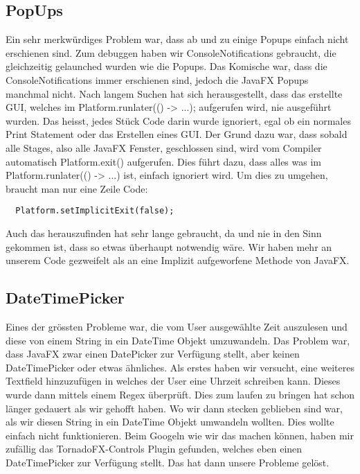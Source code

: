 \documentclass[11pt,titelpage]{scrartcl}
\begin{document}
\subsection{PopUps}
Ein sehr merkwürdiges Problem war, dass ab und zu einige Popups einfach nicht erschienen sind. Zum debuggen haben wir ConsoleNotifications gebraucht, die gleichzeitig gelaunched wurden wie die Popups. Das Komische war, dass die ConsoleNotifications immer erschienen sind, jedoch die JavaFX Popups manchmal nicht. Nach langem Suchen hat sich herausgestellt,
dass das erstellte GUI, welches im Platform.runlater(() -> {...}); aufgerufen wird, nie ausgeführt wurden. Das heisst, jedes Stück Code darin wurde ignoriert, egal ob ein
normales Print Statement oder das Erstellen eines GUI. Der Grund dazu war, dass sobald alle Stages, also alle JavaFX Fenster, geschlossen sind, wird vom Compiler automatisch
Platform.exit() aufgerufen. Dies führt dazu, dass alles was im Platform.runlater(() -> {...}) ist, einfach ignoriert wird. Um dies zu umgehen, braucht man nur eine Zeile Code:
\begin{lstlisting}
  Platform.setImplicitExit(false);
\end{lstlisting}
Auch das herauszufinden hat sehr lange gebraucht, da und nie in den Sinn gekommen ist, dass so etwas überhaupt notwendig wäre. Wir haben mehr an unserem Code gezweifelt als an eine Implizit aufgeworfene Methode von JavaFX.
\subsection{DateTimePicker}
Eines der grössten Probleme war, die vom User ausgewählte Zeit auszulesen und diese von einem String in ein DateTime Objekt umzuwandeln. Das Problem war, dass JavaFX zwar einen
DatePicker zur Verfügung stellt, aber keinen DateTimePicker oder etwas ähnliches. Als erstes haben wir versucht, eine weiteres Textfield hinzuzufügen in welches der User eine
Uhrzeit schreiben kann. Dieses wurde dann mittels einem Regex überprüft. Dies zum laufen zu bringen hat schon länger gedauert als wir gehofft haben. Wo wir dann stecken geblieben sind
war, als wir diesen String in ein DateTime Objekt umwandeln wollten. Dies wollte einfach nicht funktionieren. Beim Googeln wie wir das machen können, haben mir zufällig das
TornadoFX-Controls Plugin gefunden, welches eben einen DateTimePicker zur Verfügung stellt. Das hat dann unsere Probleme gelöst.
\end{document}

